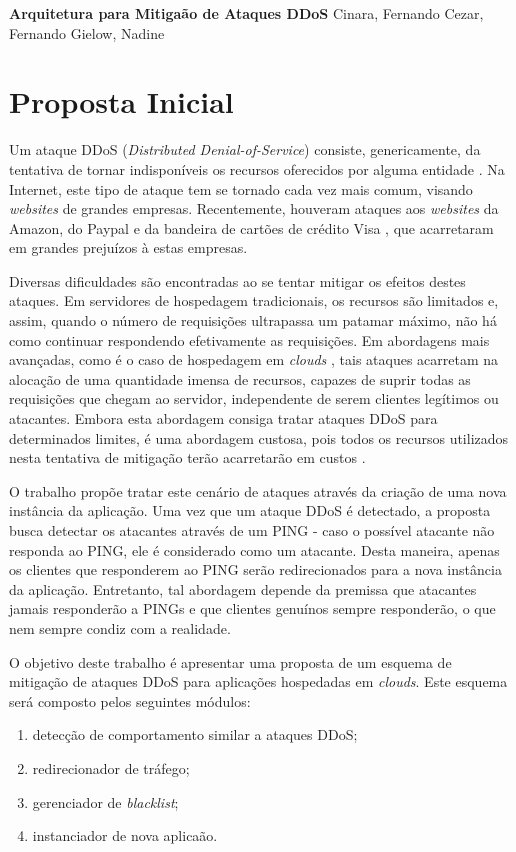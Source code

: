 \documentclass[a4paper, 11pt]{article}
\begin{document}
{
\begin{center}
{\LARGE \textbf{Arquitetura para Mitiga\cc\~ao de Ataques DDoS}}
\vskip 0.5cm
{\Large Cinara, Fernando Cezar, Fernando Gielow, Nadine}
\end{center}
}

\section{Proposta Inicial}

Um ataque DDoS (\emph{Distributed Denial-of-Service})
 consiste, genericamente, da tentativa de tornar indisponíveis
os recursos oferecidos por alguma entidade \cite{Zhang:11}. Na Internet, este
tipo de ataque tem se tornado cada vez mais comum, visando \emph{websites} de
grandes empresas. Recentemente, houveram ataques aos \emph{websites} da Amazon,
do Paypal e da bandeira de cartões de crédito Visa \cite{Zuckerman:10}, que
acarretaram em grandes prejuízos à estas empresas.

Diversas dificuldades são encontradas ao se tentar mitigar os efeitos destes
ataques. Em servidores de hospedagem tradicionais, os recursos são limitados e,
assim, quando o número de requisições ultrapassa um patamar máximo, não há como
continuar respondendo efetivamente as requisições. Em abordagens mais avançadas,
como é o caso de hospedagem em \emph{clouds} \cite{Zhang:10}, tais ataques
acarretam na alocação de uma quantidade imensa de recursos, capazes de
suprir todas as requisições que chegam ao servidor, independente de serem
clientes legítimos ou atacantes. Embora esta abordagem consiga tratar ataques
DDoS para determinados limites, é uma abordagem custosa, pois todos os recursos
utilizados nesta tentativa de mitigação ter\~ao acarretar\~ao em custos
\cite{Soon:10}.

O trabalho \cite{Bakshi:10} prop\~oe tratar este cen\'ario de ataques através da
criação de uma nova instância da aplicação. Uma vez que um ataque DDoS é
detectado, a proposta busca detectar os atacantes através de um PING -
caso o possível atacante não responda ao PING, ele é considerado como um
atacante. Desta maneira, apenas os clientes que responderem ao PING serão
redirecionados para a nova instância da aplicação. Entretanto, tal abordagem
depende da premissa que atacantes jamais responderão a PINGs e que clientes
genuínos sempre responderão, o que nem sempre condiz com a realidade. 

O objetivo deste trabalho é apresentar uma proposta de um esquema de mitigação
de ataques DDoS para aplicações hospedadas em \emph{clouds}. Este esquema será
composto pelos seguintes módulos:
\begin{enumerate}[i]
  \item detecção de comportamento similar a ataques DDoS;
  \item redirecionador de tráfego;
  \item gerenciador de \emph{blacklist};
  \item instanciador de nova aplica\cc\~ao.
\end{enumerate}  
\end{document}
